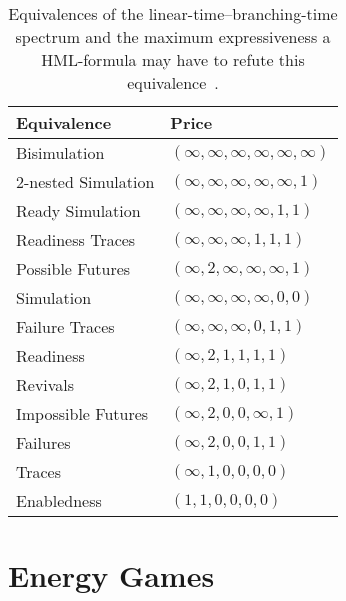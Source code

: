 \begin{table}[htpb]
    \centering
    \caption{Equivalences of the linear-time--branching-time spectrum and the
        maximum expressiveness a HML-formula may have to refute this
        equivalence~\cite{bisping2023process}.}
    \label{tab:spectrum}
    \begin{tabular}{l l}
        \toprule
        Equivalence &Price \\
        \midrule
        Bisimulation &$(\infty, \infty, \infty, \infty, \infty, \infty)$ \\
        2-nested Simulation &$(\infty, \infty, \infty, \infty, \infty, 1)$ \\
        Ready Simulation &$(\infty, \infty, \infty, \infty, 1, 1)$ \\
        Readiness Traces &$(\infty, \infty, \infty, 1, 1, 1)$ \\
        Possible Futures &$(\infty, 2, \infty, \infty, \infty, 1)$ \\
        Simulation &$(\infty, \infty, \infty, \infty, 0, 0)$ \\
        Failure Traces &$(\infty, \infty, \infty, 0, 1, 1)$ \\
        Readiness &$(\infty, 2, 1, 1, 1, 1)$ \\
        Revivals &$(\infty, 2, 1, 0, 1, 1)$ \\
        Impossible Futures &$(\infty, 2, 0, 0, \infty, 1)$ \\
        Failures &$(\infty, 2, 0, 0, 1, 1)$ \\
        Traces &$(\infty, 1, 0, 0, 0, 0)$ \\
        Enabledness &$(1, 1, 0, 0, 0, 0)$ \\
        \bottomrule
    \end{tabular}
\end{table}


\section{Energy Games}\label{sec:energy_games}


